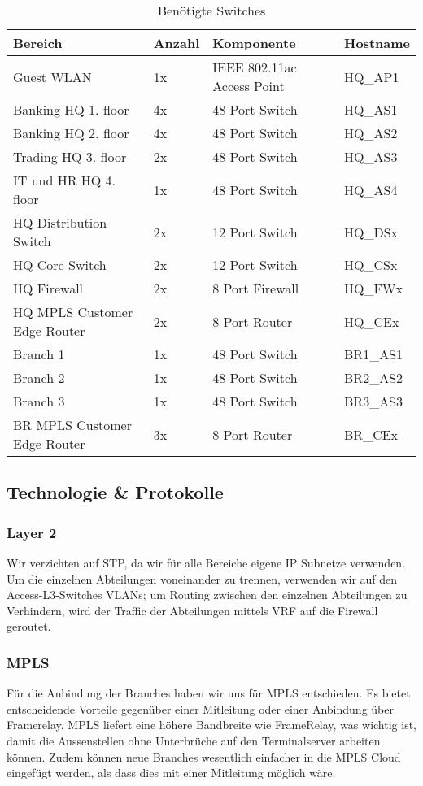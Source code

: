 \begin{table}[h]
	\centering
	\begin{tabu} to \linewidth {l l l X }
		\toprule 
		Bereich & Anzahl & Komponente & Hostname \\
		\midrule
		Guest WLAN & 1x & IEEE 802.11ac Access Point & HQ\_AP1 \\
		Banking HQ 1. floor & 4x & 48 Port Switch & HQ\_AS1 \\
		Banking HQ 2. floor & 4x & 48 Port Switch & HQ\_AS2 \\
		Trading HQ 3. floor & 2x & 48 Port Switch & HQ\_AS3 \\
		IT und HR HQ 4. floor & 1x & 48 Port Switch & HQ\_AS4 \\
		\midrule
		HQ Distribution Switch & 2x & 12 Port Switch & HQ\_DSx \\
		HQ Core Switch & 2x & 12 Port Switch & HQ\_CSx \\
		\midrule
		HQ Firewall & 2x & 8 Port Firewall & HQ\_FWx \\
		HQ MPLS Customer Edge Router & 2x & 8 Port Router & HQ\_CEx \\
		\midrule
		Branch 1 & 1x & 48 Port Switch & BR1\_AS1 \\
		Branch 2 & 1x & 48 Port Switch & BR2\_AS2 \\
		Branch 3 & 1x & 48 Port Switch & BR3\_AS3 \\
		BR MPLS Customer Edge Router & 3x & 8 Port Router & BR\_CEx \\
		\bottomrule 
	\end{tabu} 
	\caption{Benötigte Switches}
\end{table}

\subsection{Technologie \& Protokolle}
\subsubsection{Layer 2}
Wir verzichten auf STP, da wir für alle Bereiche eigene IP Subnetze verwenden. Um die einzelnen Abteilungen voneinander zu trennen, verwenden wir auf den Access-L3-Switches VLANs; um Routing zwischen den einzelnen Abteilungen zu Verhindern, wird der Traffic der Abteilungen mittels VRF auf die Firewall geroutet.

\subsubsection{MPLS}
Für die Anbindung der Branches haben wir uns für MPLS entschieden. Es bietet entscheidende Vorteile gegenüber einer Mitleitung oder einer Anbindung über Framerelay. MPLS liefert eine höhere Bandbreite wie FrameRelay, was wichtig ist, damit die Aussenstellen ohne Unterbrüche auf den Terminalserver arbeiten können. Zudem können neue Branches wesentlich einfacher in die MPLS Cloud eingefügt werden, als dass dies mit einer Mitleitung möglich wäre.

